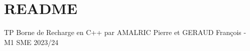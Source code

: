 \chapter{README}
\hypertarget{md__r_e_a_d_m_e}{}\label{md__r_e_a_d_m_e}
TP Borne de Recharge en C++ par AMALRIC Pierre et GERAUD François -\/ M1 SME 2023/24 